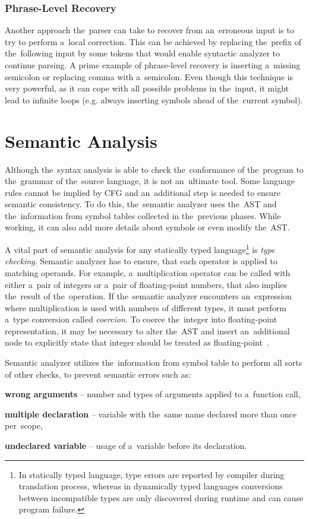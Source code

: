 \documentclass[
  digital, %
  table,   %
  lof,     %
  lot,     %
  oneside,
]{fithesis3}
\begin{document}
\subsubsection{\textbf{Phrase-Level Recovery}}
Another approach the~parser can take to recover from an~erroneous input is to try to perform a~local correction. This can be achieved by replacing the~prefix of the~following input by some tokens that would enable syntactic analyzer to continue parsing. A prime example of phrase-level recovery is inserting a~missing semicolon or replacing comma with a~semicolon. Even though this technique is very powerful, as it can cope with all possible problems in the~input, it might lead to infinite loops (e.g. always inserting symbols ahead of the~current symbol).

\section{Semantic Analysis}
Although the~syntax analysis is able to check the~conformance of the~program to the~grammar of the~source language, it is not an~ultimate tool. Some language rules cannot be implied by CFG and an~additional step is needed to ensure semantic consistency. To do this, the~semantic analyzer uses the~AST and the~information from symbol tables collected in the~previous phases. While working, it can also add more details about symbols or even modify the~AST. 

A vital part of semantic analysis for any statically typed language\footnote{In statically typed language, type errors are reported by compiler during translation process, whereas in dynamically typed languages conversions between incompatible types are only discovered during runtime and can cause program failure.} is \textit{type checking}. Semantic analyzer has to ensure, that each operator is applied to matching operands. For example, a~multiplication operator can be called with either a~pair of integers or a~pair of floating-point numbers, that also implies the~result of the~operation. If the~semantic analyzer encounters an~expression where multiplication is used with numbers of different types, it must perform a~type conversion called \textit{coercion}. To coerce the~integer into floating-point representation, it may be necessary to alter the~AST and insert an~additional node to explicitly state that integer should be treated as floating-point~\cite{dragon-book}. 

Semantic analyzer utilizes the~information from symbol table to perform all sorts of other checks, to prevent semantic errors such as:
\begin{compactitem}
  \item \textbf{wrong arguments} -- number and types of arguments applied to a~function call,
  \item \textbf{multiple declaration} -- variable with the~same name declared more than once per~scope,
  \item \textbf{undeclared variable} -- usage of a~variable before its declaration.
\end{compactitem}
    
\end{document}

